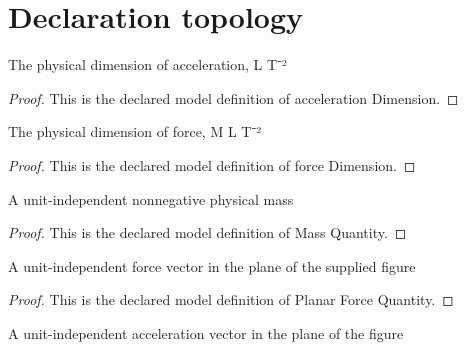 \section{Declaration topology}
\begin{definition}
  \label{def:physics:phyx-mini-0755:phyxminiproblems-problemphyxmini0755-accelerationdimension}
  The physical dimension of acceleration, L T⁻²
\end{definition}
\begin{proof}
  This is the declared model definition of acceleration Dimension.
\end{proof}
\begin{definition}
  \label{def:physics:phyx-mini-0755:phyxminiproblems-problemphyxmini0755-forcedimension}
  The physical dimension of force, M L T⁻²
\end{definition}
\begin{proof}
  This is the declared model definition of force Dimension.
\end{proof}
\begin{definition}
  \label{def:physics:phyx-mini-0755:phyxminiproblems-problemphyxmini0755-massquantity}
  A unit-independent nonnegative physical mass
\end{definition}
\begin{proof}
  This is the declared model definition of Mass Quantity.
\end{proof}
\begin{definition}
  \label{def:physics:phyx-mini-0755:phyxminiproblems-problemphyxmini0755-planarforcequantity}
  A unit-independent force vector in the plane of the supplied figure
\end{definition}
\begin{proof}
  This is the declared model definition of Planar Force Quantity.
\end{proof}
\begin{definition}
  \label{def:physics:phyx-mini-0755:phyxminiproblems-problemphyxmini0755-planaraccelerationquantity}
  A unit-independent acceleration vector in the plane of the figure
\end{definition}
